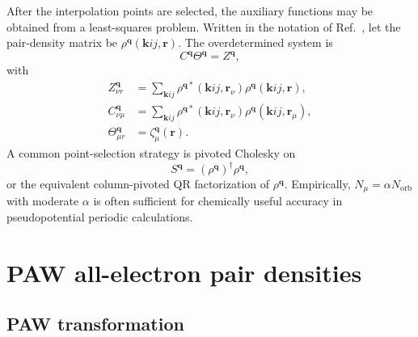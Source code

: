 \documentclass[aps,prb,reprint,superscriptaddress,longbibliography,nofootinbib]{revtex4-2}
\newcommand{\br}{\mathbf r}
\newcommand{\bk}{\mathbf k}
\newcommand{\bq}{\mathbf q}
\newcommand{\orb}{\mathrm{orb}}
\begin{document}
After the interpolation points are selected, the auxiliary functions may be obtained from a least-squares problem.  Written in the notation of Ref.~, let the pair-density matrix be \(\rho^{\bq}(\bk ij,\br)\).  The overdetermined system is
\begin{equation}
C^{\bq}\Theta^{\bq}=Z^{\bq},
\label{eq:ctheta-z}
\end{equation}
with
\begin{subequations}
\begin{align}
Z_{\nu r}^{\bq}
&=
\sum_{\bk ij}
\rho^{\bq *}(\bk ij,\br_\nu)
\rho^{\bq}(\bk ij,\br),
\label{eq:zq}\\
C_{\nu\mu}^{\bq}
&=
\sum_{\bk ij}
\rho^{\bq *}(\bk ij,\br_\nu)
\rho^{\bq}(\bk ij,\br_\mu),
\label{eq:cq}\\
\Theta_{\mu r}^{\bq}
&=\zeta_\mu^{\bq}(\br).
\label{eq:thetaq}
\end{align}
\end{subequations}
A common point-selection strategy is pivoted Cholesky on
\begin{equation}
S^{\bq}=(\rho^{\bq})^\dagger \rho^{\bq},
\label{eq:pivoted-cholesky}
\end{equation}
or the equivalent column-pivoted QR factorization of \(\rho^{\bq}\).  Empirically, \(N_\mu=\alpha N_{\orb}\) with moderate \(\alpha\) is often sufficient for chemically useful accuracy in pseudopotential periodic calculations.

\section{PAW all-electron pair densities}
\label{sec:paw}

\subsection{PAW transformation}
\end{document}
